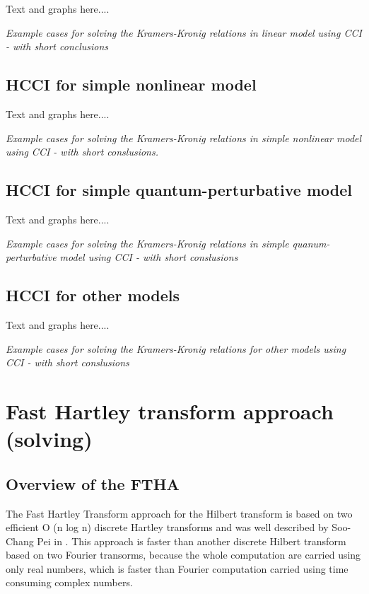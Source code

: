 \documentclass[12pt,twoside,a4paper]{article}
\numberwithin{equation}{subsection}
\numberwithin{figure}{subsection}
\begin{document}
Text and graphs here.... 

\textit{Example cases for solving the Kramers-Kronig relations in linear model using CCI - with short conclusions}

\subsection{HCCI for simple nonlinear model} \label{chap:hcc_nlo}

Text and graphs here.... 

\textit{Example cases for solving the Kramers-Kronig relations in simple nonlinear model using CCI - with short conslusions.}


\subsection{HCCI for simple quantum-perturbative model} \label{chap:hcc_quantum}
 
Text and graphs here.... 

\textit{Example cases for solving the Kramers-Kronig relations in simple quanum-perturbative model using CCI - with short
conslusions}

\subsection{HCCI for other models} \label{chap:hcc_other}

Text and graphs here.... 

\textit{Example cases for solving the Kramers-Kronig relations for other models using CCI - with short conslusions}

\section{Fast Hartley transform approach (solving)} \label{chap:hartley}

\subsection{Overview of the FTHA} \label{chap:hartley_overview}

The Fast Hartley Transform approach for the Hilbert transform is based on two efficient O (n log n) discrete Hartley transforms and
was well described by Soo-Chang Pei in \cite{chang_computation}. This approach is faster than another discrete Hilbert transform
based on two Fourier transorms, because the whole computation are carried using only real numbers, which is faster than Fourier computation carried
using time consuming complex numbers.
\end{document}
